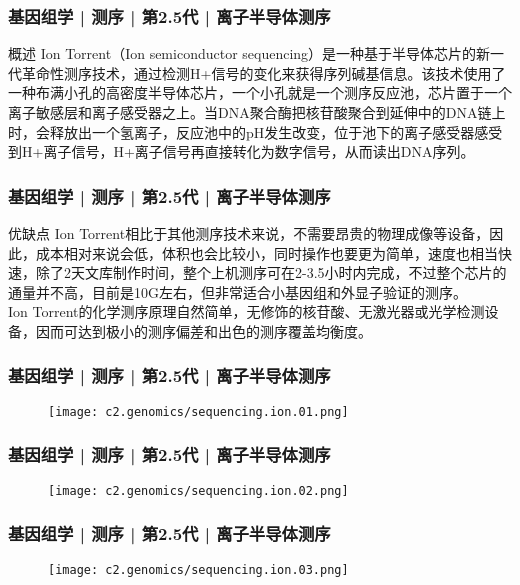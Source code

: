 \begin{frame}
  \frametitle{基因组学 | 测序 | 第2.5代 | 离子半导体测序}
  \begin{block}{概述}
    Ion Torrent（Ion semiconductor sequencing）是一种基于半导体芯片的新一代革命性测序技术，通过检测H+信号的变化来获得序列碱基信息。该技术使用了一种布满小孔的高密度半导体芯片，一个小孔就是一个测序反应池，芯片置于一个离子敏感层和离子感受器之上。当DNA聚合酶把核苷酸聚合到延伸中的DNA链上时，会释放出一个氢离子，反应池中的pH发生改变，位于池下的离子感受器感受到H+离子信号，H+离子信号再直接转化为数字信号，从而读出DNA序列。
  \end{block}
\end{frame}

\begin{frame}
  \frametitle{基因组学 | 测序 | 第2.5代 | 离子半导体测序}
  \begin{block}{优缺点}
Ion Torrent相比于其他测序技术来说，不需要昂贵的物理成像等设备，因此，成本相对来说会低，体积也会比较小，同时操作也要更为简单，速度也相当快速，除了2天文库制作时间，整个上机测序可在2-3.5小时内完成，不过整个芯片的通量并不高，目前是10G左右，但非常适合小基因组和外显子验证的测序。\\
\vspace{1em}
Ion Torrent的化学测序原理自然简单，无修饰的核苷酸、无激光器或光学检测设备，因而可达到极小的测序偏差和出色的测序覆盖均衡度。
  \end{block}
\end{frame}

\begin{frame}
  \frametitle{基因组学 | 测序 | 第2.5代 | 离子半导体测序}
  \begin{figure}
    \centering
    \texttt{[image: c2.genomics/sequencing.ion.01.png]}
  \end{figure}
\end{frame}

\begin{frame}
  \frametitle{基因组学 | 测序 | 第2.5代 | 离子半导体测序}
  \begin{figure}
    \centering
    \texttt{[image: c2.genomics/sequencing.ion.02.png]}
  \end{figure}
\end{frame}

\begin{frame}
  \frametitle{基因组学 | 测序 | 第2.5代 | 离子半导体测序}
  \begin{figure}
    \centering
    \texttt{[image: c2.genomics/sequencing.ion.03.png]}
  \end{figure}
\end{frame}

